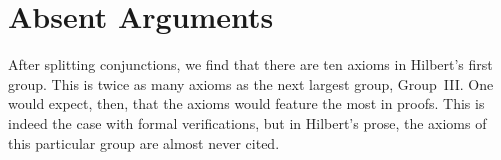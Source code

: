 
\section{Absent Arguments}
After splitting conjunctions, we find that there are ten axioms in Hilbert's first group. This is twice as many axioms as the next largest group, Group~III. One would expect, then, that the axioms would feature the most in proofs. This is indeed the case with formal verifications, but in Hilbert's prose, the axioms of this particular group are almost never cited.

